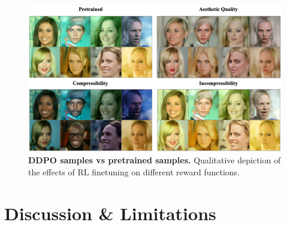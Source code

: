 \begin{figure}[ht]
  \centering
  \includegraphics[scale=0.72]{img/results/visual-comparison-results-200dpi.png}
  \vspace{-4pt}  %
    \captionsetup{width=\textwidth} %
    \caption{\textbf{DDPO samples vs pretrained samples.} Qualitative depiction of the effects of RL finetuning on different reward functions.}
    \label{fig:visual-comparison-ddpo}
\end{figure}


\section{Discussion \& Limitations}

\lipsum[1]

\lipsum[4]

